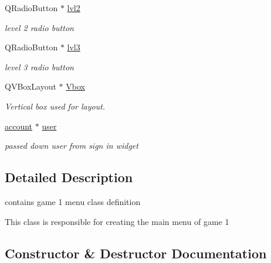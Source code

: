 \begin{DoxyCompactItemize}
\mbox{\label{classgame1menu_a32e7765d0637c337cc195c510edde27b}} 
Q\+Radio\+Button $\ast$ \hyperlink{classgame1menu_a32e7765d0637c337cc195c510edde27b}{lvl2}
\begin{DoxyCompactList}\small\item\em level 2 radio button \end{DoxyCompactList}\item 
\mbox{\label{classgame1menu_a047d717fb9fa6b3aacc15190b094195f}} 
Q\+Radio\+Button $\ast$ \hyperlink{classgame1menu_a047d717fb9fa6b3aacc15190b094195f}{lvl3}
\begin{DoxyCompactList}\small\item\em level 3 radio button \end{DoxyCompactList}\item 
\mbox{\label{classgame1menu_a4d836229d25f2a14949d7413ea56e713}} 
Q\+V\+Box\+Layout $\ast$ \hyperlink{classgame1menu_a4d836229d25f2a14949d7413ea56e713}{Vbox}
\begin{DoxyCompactList}\small\item\em Vertical box used for layout. \end{DoxyCompactList}\item 
\mbox{\label{classgame1menu_a4d33841ad396918e93608c06b8165a12}} 
\hyperlink{classaccount}{account} $\ast$ \hyperlink{classgame1menu_a4d33841ad396918e93608c06b8165a12}{user}
\begin{DoxyCompactList}\small\item\em passed down user from sign in widget \end{DoxyCompactList}\end{DoxyCompactItemize}


\subsection{Detailed Description}
contains game 1 menu class definition 

This class is responsible for creating the main menu of game 1 

\subsection{Constructor \& Destructor Documentation}
\mbox{\label{classgame1menu_ae63648153a4fb03068f9ee8dc3bc79dc}} 
